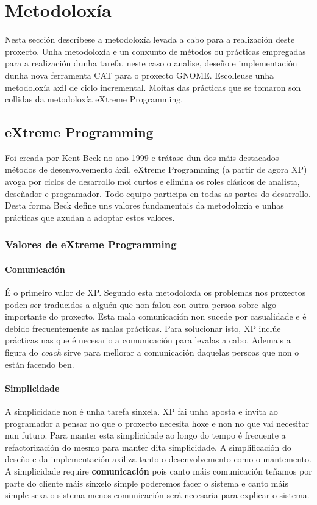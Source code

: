 \chapter{Metodoloxía}

Nesta sección descríbese a metodoloxía levada a cabo para a realización deste proxecto. Unha metodoloxía e un conxunto de métodos ou prácticas empregadas para a realización dunha tarefa, neste caso o analise, deseño e implementación dunha nova ferramenta CAT para o proxecto GNOME. Escolleuse unha metodoloxía axil de ciclo incremental. Moitas das prácticas que se tomaron son collidas da metodoloxía eXtreme Programming.

\section{eXtreme Programming}

Foi creada por Kent Beck no ano 1999 e trátase dun dos máis destacados métodos de desenvolvemento áxil. eXtreme Programming (a partir de agora XP) avoga por ciclos de desarrollo moi curtos e elimina os roles clásicos de analista, deseñador e programador. Todo equipo participa en todas as partes do desarrollo. Desta forma Beck define uns valores fundamentais da metodoloxía e unhas prácticas que axudan a adoptar estos valores.

\subsection{Valores de eXtreme Programming}

\subsubsection{Comunicación}
É o primeiro valor de XP. Segundo esta metodoloxía os problemas nos proxectos poden ser traducidos a alguén que non falou con outra persoa sobre algo importante do proxecto. Esta mala comunicación non sucede por casualidade e é debido frecuentemente as malas prácticas. Para solucionar isto, XP inclúe prácticas nas que é necesario a comunicación para levalas a cabo. Ademais a figura do \emph{coach} sirve para mellorar a comunicación daquelas persoas que non o están facendo ben.

\subsubsection{Simplicidade}

A simplicidade non é unha tarefa sinxela. XP fai unha aposta e invita ao programador a pensar no que o proxecto necesita hoxe e non no que vai necesitar nun futuro. Para manter esta simplicidade ao longo do tempo é frecuente a refactorización do mesmo para manter dita simplicidade. A simplificación do deseño e da implementación axiliza tanto o desenvolvemento como o mantemento. A simplicidade require \textbf{comunicación} pois canto máis comunicación teñamos por parte do cliente máis sinxelo simple poderemos facer o sistema e canto máis simple sexa o sistema menos comunicación será necesaria para explicar o sistema.

